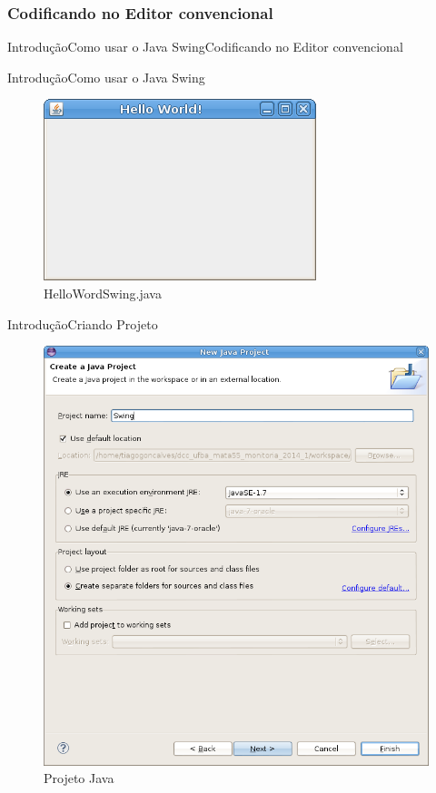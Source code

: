 \documentclass[10pt]{beamer}
\begin{document}
\subsubsection{Codificando no Editor convencional}
\begin{frame}[allowframebreaks]{Introdução}{Como usar o Java Swing}{Codificando no Editor convencional}

\end{frame}{}

\begin{frame}{Introdução}{Como usar o Java Swing}
  \begin{figure}[!htb]
    \centering
    \includegraphics[scale=0.5]{hello_world}
    \caption{HelloWordSwing.java}
    \label{figRotulo}
  \end{figure}
\end{frame}{}


\begin{frame}{Introdução}{Criando Projeto}
  \begin{figure}[!htb]
    \centering
    \includegraphics[scale=0.25]{criando_projeto_swing}
    \caption{Projeto Java}
    \label{figRotulo}
  \end{figure}
\end{frame}{}
\end{document}
